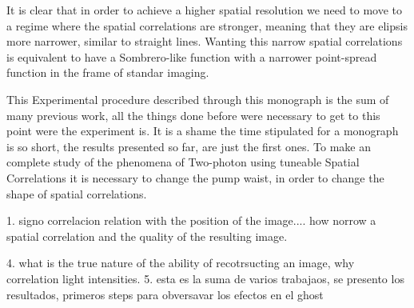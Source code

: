 It is clear that in order to achieve a higher spatial resolution we need to move to a regime where the spatial correlations are
stronger, meaning that they are elipsis more narrower, similar to straight lines. Wanting this narrow spatial correlations is equivalent 
to have a Sombrero-like function with a narrower point-spread function in the frame of standar imaging.

This Experimental procedure described through this monograph is the sum of many previous work, all the things done before
were necessary to get to this point were the experiment is. It is a shame the time stipulated for a monograph is so short,
the results presented so far, are just the first ones. To make an complete study of the 
phenomena of Two-photon using tuneable Spatial Correlations it is necessary to change the pump waist, in order to change the shape of 
spatial correlations.


1. signo correlacion relation with the position of the image.... how norrow a spatial correlation and the quality of the resulting image.

4. what is the true nature of the ability of recotrsucting an image, why correlation light intensities.\cite{zhong}
5. esta es la suma de varios trabajaos, se presento los resultados, primeros steps para obversavar los efectos en el ghost 


